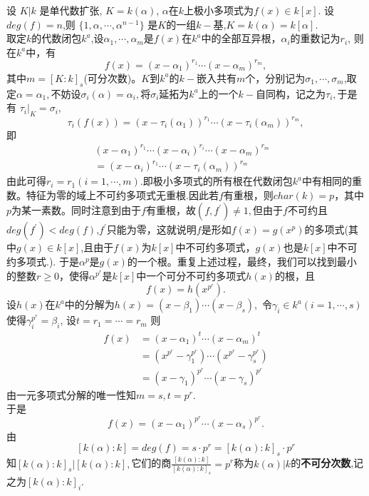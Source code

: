 \documentclass[UTF8]{article}
\begin{document}
设
$K|k$
是单代数扩张,
$K=k(\alpha)$, $\alpha$在$k$上极小多项式为$f(x)\in k[x]$.
设$deg(f)=n$,则
$\{1,\alpha,\cdots,\alpha^{n-1}\}$
是$K$的一组$k-$基,$K=k(\alpha)=k[\alpha].$\\
取定$k$的代数闭包$k^{a}$,设$\alpha_{1},\cdots,\alpha_{m}$是$f(x)$在$k^{a}$中的全部互异根，$\alpha_{i}$的重数记为$r_{i}$,
则在$k^{a}$中，有
$$
f(x)=(x-\alpha_{1})^{r_{1}}\cdots (x-\alpha_{m})^{r_{m}},
$$
其中$m=[K:k]_{s}$(可分次数)。$K$到$k^{a}$的$k-$嵌入共有$m$个，分别记为$\sigma_{1},\cdots,\sigma_{m}$,取定$\alpha=\alpha_{1},$不妨设$\sigma_{i}(\alpha)=\alpha_{i},$将$\sigma_{i}$延拓为$k^{a}$上的一个$k-$自同构，记之为$\tau_{i},$于是有
$\tau_{i}|_{K}=\sigma_{i},$ 
$$\tau_{i}(f(x))=(x-\tau_{i}(\alpha_{1}))^{r_{1}}\cdots(x-\tau_{i}(\alpha_{m}))^{r_{m}},$$
即
\[\begin{split}
(x-\alpha_{1})^{r_{1}}\cdots(x-\alpha_{i})^{r_{i}}\cdots(x-\alpha_{m})^{r_{m}}&\\
=(x-\alpha_{i})^{r_{1}}\cdots(x-\tau_{i}(\alpha_{m}))^{r_{m}}
\end{split}\]
由此可得$r_{i}=r_{1}(i=1,\cdots,m).$即极小多项式的所有根在代数闭包$k^{a}$中有相同的重数。特征为零的域上不可约多项式无重根.因此若$f$有重根，则$char(k)=p$，其中$p$为某一素数。同时注意到由于$f$有重根，故$(f,f^{'})\neq 1,$但由于$f$不可约且
$deg(f^{'})<deg(f)$,$f^{'}$只能为零，这就说明$f$是形如$f(x)=g(x^{p})$的多项式(其中$g(x)\in k[x]$,且由于$f(x)$为$k[x]$中不可约多项式，$g(x)$也是$k[x]$中不可约多项式.).
于是$\alpha^{p}$是$g(x)$的一个根。重复上述过程，最终，我们可以找到最小的整数$r\geq 0$，使得$\alpha^{p^{r}}$是$k[x]$中一个可分不可约多项式$h(x)$的根，且
$$
f(x)=h(x^{p^{r}}).
$$
设$h(x)$在$k^{a}$中的分解为$h(x)=(x-\beta_{1})\cdots(x-\beta_{s}),$
令$\gamma_{i}\in k^{a}(i=1,\cdots,s)$使得$\gamma_{i}^{p^{r}}=\beta_{i}$,
设$t=r_{1}=\cdots=r_{m}$
则\[\begin{split}
f(x)&=(x-\alpha_{1})^{t}\cdots (x-\alpha_{m})^{t}\\
&=(x^{p^{r}}-\gamma_{1}^{p^{r}})
\cdots(x^{p^{r}}-\gamma_{s}^{p^{r}})\\
&=(x-\gamma_{1})^{p^{r}}\cdots(x-\gamma_{s})^{p^{r}}
\end{split}
\]
由一元多项式分解的唯一性知$m=s,t=p^{r}.$\\
于是
$$f(x)=(x-\alpha_{1})^{p^{r}}\cdots(x-\alpha_{s})^{p^{r}}.$$
由$$
[k(\alpha):k]=deg(f)=s\cdot p^{r}=[k(\alpha):k]_{s}\cdot p^{r}
$$
知$[k(\alpha):k]_{s}|[k(\alpha):k],$它们的商$\frac{[k(\alpha):k]}{[k(\alpha):k]_{s}}=p^{r}$称为$k(\alpha)|k$的\textbf{不可分次数},记之为$[k(\alpha):k]_{i}$.\\
\end{document}
